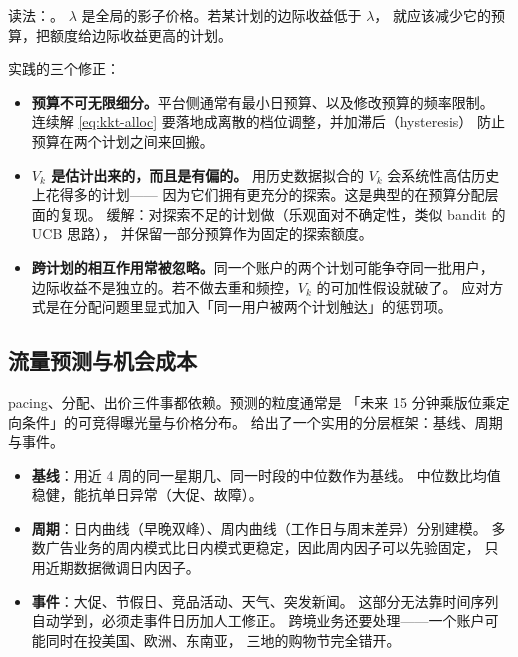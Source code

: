 读法：。
$\lambda$ 是全局的影子价格。若某计划的边际收益低于 $\lambda$，
就应该减少它的预算，把额度给边际收益更高的计划。

实践的三个修正：

\begin{itemize}
  \item \textbf{预算不可无限细分。}平台侧通常有最小日预算、以及修改预算的频率限制。
        连续解 \eqref{eq:kkt-alloc} 要落地成离散的档位调整，并加滞后（hysteresis）
        防止预算在两个计划之间来回搬。
  \item \textbf{$V_k$ 是估计出来的，而且是有偏的。}
        用历史数据拟合的 $V_k$ 会系统性高估历史上花得多的计划——
        因为它们拥有更充分的探索。这是典型的在预算分配层面的复现。
        缓解：对探索不足的计划做（乐观面对不确定性，类似 bandit 的 UCB 思路），
        并保留一部分预算作为固定的探索额度。
  \item \textbf{跨计划的相互作用常被忽略。}同一个账户的两个计划可能争夺同一批用户，
        边际收益不是独立的。若不做去重和频控，$V_k$ 的可加性假设就破了。
        应对方式是在分配问题里显式加入「同一用户被两个计划触达」的惩罚项。
\end{itemize}

\subsection{流量预测与机会成本}

pacing、分配、出价三件事都依赖。预测的粒度通常是
「未来 15 分钟乘版位乘定向条件」的可竞得曝光量与价格分布。
\cite{hyndman2021forecasting} 给出了一个实用的分层框架：基线、周期与事件。

\begin{itemize}
  \item \textbf{基线}：用近 4 周的同一星期几、同一时段的中位数作为基线。
        中位数比均值稳健，能抗单日异常（大促、故障）。
  \item \textbf{周期}：日内曲线（早晚双峰）、周内曲线（工作日与周末差异）分别建模。
        多数广告业务的周内模式比日内模式更稳定，因此周内因子可以先验固定，
        只用近期数据微调日内因子。
  \item \textbf{事件}：大促、节假日、竞品活动、天气、突发新闻。
        这部分无法靠时间序列自动学到，必须走事件日历加人工修正。
        跨境业务还要处理——一个账户可能同时在投美国、欧洲、东南亚，
        三地的购物节完全错开。
\end{itemize}

